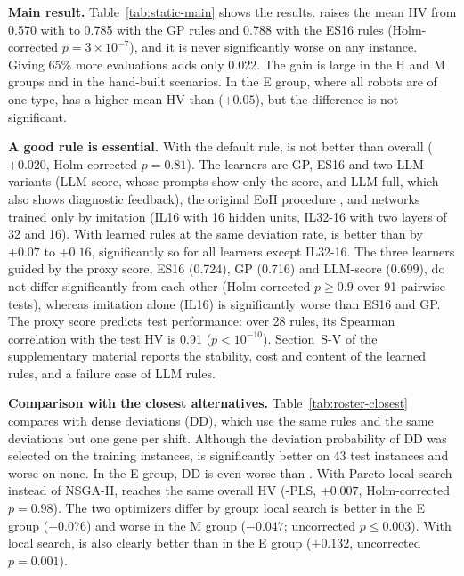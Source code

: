 \textbf{Main result.}
Table~\ref{tab:static-main} shows the results.
\RDD raises the mean HV from 0.570 with  to 0.785 with the GP rules and 0.788 with the ES16 rules (Holm-corrected $p = 3 \times 10^{-7}$),
and it is never significantly worse on any instance.
Giving  65\% more evaluations adds only 0.022.
The gain is large in the H and M groups and in the hand-built scenarios.
In the E group, where all robots are of one type, \RDD has a higher mean HV than  ($+0.05$), but the difference is not significant.

\textbf{A good rule is essential.}
With the default rule, \RDD is not better than  overall ($+0.020$, Holm-corrected $p = 0.81$).
The learners are GP, ES16 and two LLM variants (LLM-score, whose prompts show only the score, and LLM-full, which also shows diagnostic feedback),
the original EoH procedure \cite{liu2024evolution}, and networks trained only by imitation (IL16 with 16 hidden units, IL32-16 with two layers of 32 and 16).
With learned rules at the same deviation rate, \RDD is better than  by $+0.07$ to $+0.16$, significantly so for all learners except IL32-16.
The three learners guided by the proxy score, ES16 (0.724), GP (0.716) and LLM-score (0.699), do not differ significantly from each other (Holm-corrected $p \ge 0.9$ over 91 pairwise tests),
whereas imitation alone (IL16) is significantly worse than ES16 and GP.
The proxy score predicts test performance: over 28 rules, its Spearman correlation with the test HV is 0.91 ($p < 10^{-10}$).
Section~S-V of the supplementary material reports the stability, cost and content of the learned rules, and a failure case of LLM rules.

\textbf{Comparison with the closest alternatives.}
Table~\ref{tab:roster-closest} compares \RDD with dense deviations (DD), which use the same rules and the same deviations but one gene per shift.
Although the deviation probability of DD was selected on the training instances, \RDD is significantly better on 43 test instances and worse on none.
In the E group, DD is even worse than .
With Pareto local search instead of NSGA-II, \RDD reaches the same overall HV (\RDD-PLS, $+0.007$, Holm-corrected $p = 0.98$).
The two optimizers differ by group: local search is better in the E group ($+0.076$) and worse in the M group ($-0.047$; uncorrected $p \le 0.003$).
With local search, \RDD is also clearly better than  in the E group ($+0.132$, uncorrected $p = 0.001$).

